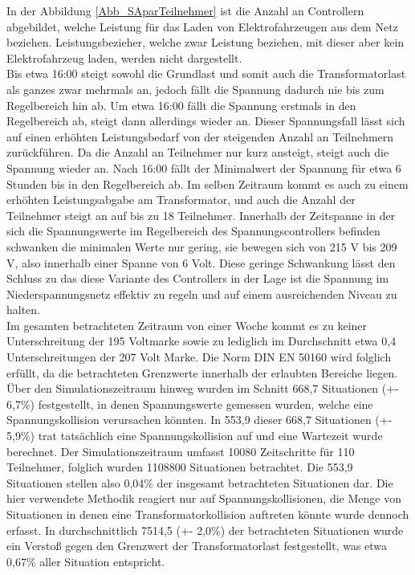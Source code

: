 In der Abbildung \ref{Abb_SAparTeilnehmer} ist die Anzahl an Controllern abgebildet, welche Leistung für das Laden von Elektrofahrzeugen aus dem Netz beziehen. Leistungsbezieher, welche zwar Leistung beziehen, mit dieser aber kein Elektrofahrzeug laden, werden nicht dargestellt. \\
Bis etwa 16:00 steigt sowohl die Grundlast und somit auch die Transformatorlast als ganzes zwar mehrmals an, jedoch fällt die Spannung dadurch nie bis zum Regelbereich hin ab. Um etwa 16:00 fällt die Spannung erstmals in den Regelbereich ab, steigt dann allerdings wieder an. Dieser Spannungsfall lässt sich auf einen erhöhten Leistungsbedarf von der steigenden Anzahl an Teilnehmern zurückführen. Da die Anzahl an Teilnehmer nur kurz ansteigt, steigt auch die Spannung wieder an. Nach 16:00 fällt der Minimalwert der Spannung für etwa 6 Stunden bis in den Regelbereich ab. Im selben Zeitraum kommt es auch zu einem erhöhten Leistungsabgabe am Transformator, und auch die Anzahl der Teilnehmer steigt an auf bis zu 18 Teilnehmer. Innerhalb der Zeitspanne in der sich die Spannungswerte im Regelbereich des Spannungscontrollers befinden schwanken die minimalen Werte nur gering, sie bewegen sich von 215 V bis 209 V, also innerhalb einer Spanne von 6 Volt. Diese geringe Schwankung lässt den Schluss zu das diese Variante des Controllers in der Lage ist die Spannung im Niederspannungsnetz effektiv zu regeln und auf einem ausreichenden Niveau zu halten. \\
Im gesamten betrachteten Zeitraum von einer Woche kommt es zu keiner Unterschreitung der 195 Voltmarke sowie zu lediglich im Durchschnitt etwa 0,4 Unterschreitungen der 207 Volt Marke. Die Norm DIN EN 50160 wird folglich erfüllt, da die betrachteten Grenzwerte innerhalb der erlaubten Bereiche liegen.\\
Über den Simulationszeitraum hinweg wurden im Schnitt 668,7 Situationen (+- 6,7\%) festgestellt, in denen Spannungswerte gemessen wurden, welche eine Spannungskollision verursachen könnten. In 553,9 dieser 668,7 Situationen (+- 5,9\%) trat tatsächlich eine Spannungskollision auf und eine Wartezeit wurde berechnet. Der Simulationszeitraum umfasst 10080 Zeitschritte für 110 Teilnehmer, folglich wurden 1108800 Situationen betrachtet. Die 553,9 Situationen stellen also 0,04\% der insgesamt betrachteten Situationen dar. Die hier verwendete Methodik reagiert nur auf Spannungskollisionen, die Menge von Situationen in denen eine Transformatorkollision auftreten könnte wurde dennoch erfasst. In durchschnittlich 7514,5 (+- 2,0\%) der betrachteten Situationen wurde ein Verstoß gegen den Grenzwert der Transformatorlast festgestellt, was etwa 0,67\% aller Situation entspricht.\\
